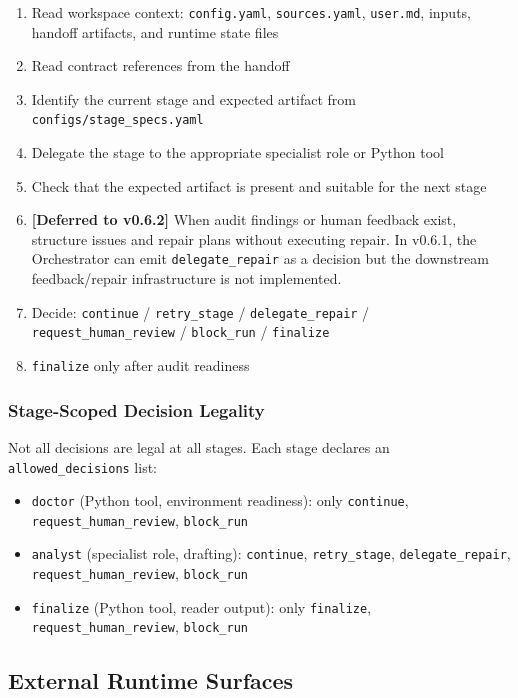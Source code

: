 \documentclass[11pt,a4paper]{article}
\begin{document}
\begin{enumerate}[leftmargin=*,itemsep=1pt]
    \item Read workspace context: \texttt{config.yaml}, \texttt{sources.yaml}, \texttt{user.md}, inputs, handoff artifacts, and runtime state files
    \item Read contract references from the handoff
    \item Identify the current stage and expected artifact from \texttt{configs/stage\_specs.yaml}
    \item Delegate the stage to the appropriate specialist role or Python tool
    \item Check that the expected artifact is present and suitable for the next stage
    \item \textbf{[Deferred to v0.6.2]} When audit findings or human feedback exist, structure issues and repair plans without executing repair. In v0.6.1, the Orchestrator can emit \texttt{delegate\_repair} as a decision but the downstream feedback/repair infrastructure is not implemented.
    \item Decide: \texttt{continue} / \texttt{retry\_stage} / \texttt{delegate\_repair} / \texttt{request\_human\_review} / \texttt{block\_run} / \texttt{finalize}
    \item \texttt{finalize} only after audit readiness
\end{enumerate}

\subsubsection{Stage-Scoped Decision Legality}

Not all decisions are legal at all stages. Each stage declares an \texttt{allowed\_decisions} list:
\begin{itemize}[leftmargin=*,itemsep=1pt]
    \item \texttt{doctor} (Python tool, environment readiness): only \texttt{continue}, \texttt{request\_human\_review}, \texttt{block\_run}
    \item \texttt{analyst} (specialist role, drafting): \texttt{continue}, \texttt{retry\_stage}, \texttt{delegate\_repair}, \texttt{request\_human\_review}, \texttt{block\_run}
    \item \texttt{finalize} (Python tool, reader output): only \texttt{finalize}, \texttt{request\_human\_review}, \texttt{block\_run}
\end{itemize}

\subsection{External Runtime Surfaces}
\end{document}
